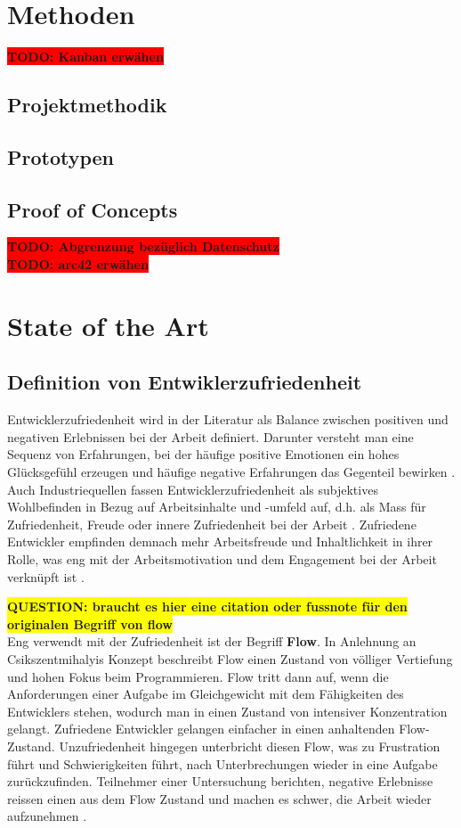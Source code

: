 \documentclass[12pt,a4paper]{report}
\newcommand{\todo}[1]{\colorbox{red}{\textbf{TODO: #1}}\\}
\newcommand{\question}[1]{\colorbox{yellow}{\textbf{QUESTION: #1}}\\}
\begin{document}
\chapter{Methoden}
\todo{Kanban erwähen}
\section{Projektmethodik}
\section{Prototypen}
\section{Proof of Concepts}
\todo{Abgrenzung bezüglich Datenschutz}
\todo{arc42 erwähen}

\chapter{State of the Art}
\section{Definition von Entwiklerzufriedenheit}

Entwicklerzufriedenheit wird in der Literatur als Balance zwischen positiven und negativen Erlebnissen bei der
Arbeit definiert. Darunter versteht man eine Sequenz von Erfahrungen, bei der häufige positive Emotionen ein
hohes Glücksgefühl erzeugen und häufige negative Erfahrungen das Gegenteil bewirken \cite{sadowski_happiness_2019}.
Auch Industriequellen fassen Entwicklerzufriedenheit als subjektives Wohlbefinden in Bezug auf Arbeitsinhalte
und -umfeld auf, d.h. als Mass für Zufriedenheit, Freude oder innere Zufriedenheit bei der Arbeit \cite{zenhub_2022_nodate}.
Zufriedene Entwickler empfinden demnach mehr Arbeitsfreude und Inhaltlichkeit in ihrer Rolle, was eng mit
der Arbeitsmotivation und dem Engagement bei der Arbeit verknüpft ist \cite{franca_motivation_2020}.

\question{braucht es hier eine citation oder fussnote für den originalen Begriff von flow}
Eng verwendt mit der Zufriedenheit ist der Begriff \textbf{Flow}. In Anlehnung an Csikszentmihalyis Konzept beschreibt
Flow einen Zustand von völliger Vertiefung und hohen Fokus beim Programmieren. Flow tritt dann auf, wenn die Anforderungen
einer Aufgabe im Gleichgewicht mit dem Fähigkeiten des Entwicklers stehen, wodurch man in einen Zustand von intensiver 
Konzentration gelangt. Zufriedene Entwickler gelangen einfacher in einen anhaltenden Flow-Zustand. Unzufriedenheit
hingegen unterbricht diesen Flow, was zu Frustration führt und Schwierigkeiten führt, nach Unterbrechungen wieder in
eine Aufgabe zurückzufinden. Teilnehmer einer Untersuchung berichten, negative Erlebnisse reissen einen aus dem Flow
Zustand und machen es schwer, die Arbeit wieder aufzunehmen \cite{sadowski_happiness_2019}.
\end{document}
